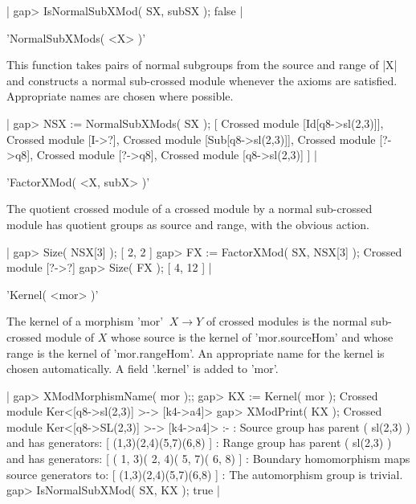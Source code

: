 |    gap> IsNormalSubXMod( SX, subSX );
    false  |

%

'NormalSubXMods( <X> )'

This  function takes  pairs of normal   subgroups from the source  and
range of |X|  and constructs a normal  sub-crossed module whenever the
axioms are satisfied.  Appropriate names are chosen where possible.

|    gap> NSX := NormalSubXMods( SX );
    [ Crossed module [Id[q8->sl(2,3)]], Crossed module [I->?], 
      Crossed module [Sub[q8->sl(2,3)]], Crossed module [?->q8], 
      Crossed module [?->q8], Crossed module [q8->sl(2,3)] ]    |

%

'FactorXMod( <X, subX> )'

The  quotient   crossed module  of  a   crossed   module  by a  normal
sub-crossed module  has quotient groups as  source and range, with the
obvious action.

|    gap> Size( NSX[3] );
    [ 2, 2 ]
    gap> FX := FactorXMod( SX, NSX[3] );
    Crossed module [?->?]
    gap> Size( FX );
    [ 4, 12 ]  |

%

'Kernel( <mor> )'

The kernel of a morphism 'mor' $\: X \to  Y$ of crossed modules is the
normal  sub-crossed  module of  $X$  whose  source  is the   kernel of
'mor.sourceHom' and whose range  is the kernel  of 'mor.rangeHom'.  An
appropriate  name for the  kernel  is  chosen automatically.  A  field
'.kernel' is added to 'mor'.

|    gap> XModMorphismName( mor );;
    gap> KX := Kernel( mor );
    Crossed module Ker<[q8->sl(2,3)] >-> [k4->a4]>
    gap> XModPrint( KX );
    Crossed module Ker<[q8->SL(2,3)] >-> [k4->a4]> :- 
    : Source group has parent ( sl(2,3) )  and has generators:
      [ (1,3)(2,4)(5,7)(6,8) ]
    : Range group has parent ( sl(2,3) )  and has generators:
      [ ( 1, 3)( 2, 4)( 5, 7)( 6, 8) ]
    : Boundary homomorphism maps source generators to:
      [ (1,3)(2,4)(5,7)(6,8) ]
    : The automorphism group is trivial.
    gap> IsNormalSubXMod( SX, KX );
    true   |

